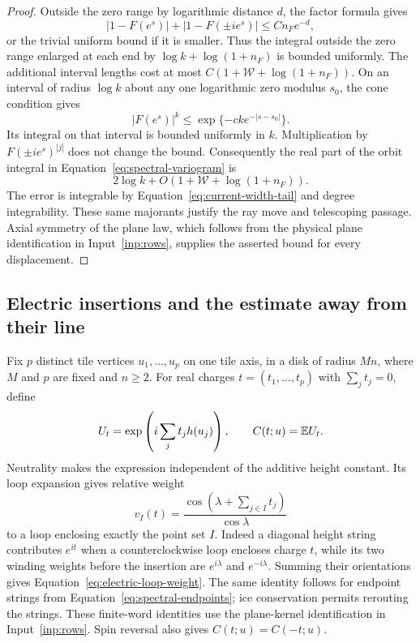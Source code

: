 \begin{proof}
Outside the zero range by logarithmic distance $d$, the factor
formula gives
\[
 |1-F(e^s)|+|1-F(\pm i e^s)|\le C n_F e^{-d},
\]
or the trivial uniform bound if it is smaller.  Thus the integral
outside the zero range enlarged at each end by
$\log k+\log(1+n_F)$ is bounded uniformly.  The additional
interval lengths cost at most
$C(1+\mathcal W+\log(1+n_F))$.  On an interval of radius
$\log k$ about any one logarithmic zero modulus $s_0$, the cone
condition gives
\[
 |F(e^s)|^k\le\exp\{-c k e^{-|s-s_0|}\}.
\]
Its integral on that interval is bounded uniformly in $k$.
Multiplication by $F(\pm i e^s)^{|j|}$ does not change the bound.
Consequently the real part of the orbit integral in
Equation~\eqref{eq:spectral-variogram} is
\[
 2\log k+O(1+\mathcal W+\log(1+n_F)).
\]
The error is integrable by Equation~\eqref{eq:current-width-tail}
and degree integrability.  These same majorants justify the ray
move and telescoping passage.  Axial symmetry of the plane law,
which follows from the physical plane identification in
Input~\ref{inp:rows}, supplies the asserted bound for every
displacement.
\end{proof}

\subsection{Electric insertions and the estimate away from their line}

Fix $p$ distinct tile vertices $u_1,\ldots,u_p$ on one tile axis,
in a disk of radius $Mn$, where $M$ and $p$ are fixed and $n\ge2$.
For real charges $t=(t_1,\ldots,t_p)$ with $\sum_jt_j=0$, define
\begin{equation}\label{eq:electric-characteristic}
 U_t=\exp\left(i\sum_jt_jh(u_j)\right),\qquad
 C(t;u)=\mathbb E U_t.
\end{equation}
Neutrality makes the expression independent of the additive height
constant.  Its loop expansion gives relative weight
\begin{equation}\label{eq:electric-loop-weight}
 v_I(t)=\frac{\cos(\lambda+\sum_{j\in I}t_j)}{\cos\lambda}
\end{equation}
to a loop enclosing exactly the point set $I$.  Indeed a diagonal
height string contributes $e^{it}$ when a counterclockwise loop
encloses charge $t$, while its two winding weights before the
insertion are $e^{i\lambda}$ and $e^{-i\lambda}$.  Summing their
orientations gives Equation~\eqref{eq:electric-loop-weight}.
The same identity follows for endpoint strings from
Equation~\eqref{eq:spectral-endpoints}; ice conservation permits
rerouting the strings.  These finite-word identities use the
plane-kernel identification in Input~\ref{inp:rows}.  Spin reversal
also gives $C(t;u)=C(-t;u)$.

